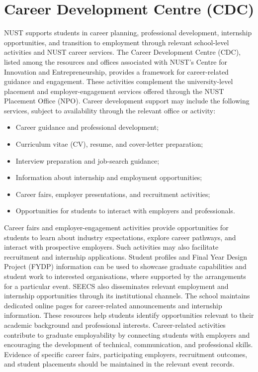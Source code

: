 \section{Career Development Centre (CDC)}

NUST supports students in career planning, professional development, internship opportunities, and transition to employment through relevant school-level activities and NUST career services. The Career Development Centre (CDC), listed among the resources and offices associated with NUST's Centre for Innovation and Entrepreneurship, provides a framework for career-related guidance and engagement. These activities complement the university-level placement and employer-engagement services offered through the NUST Placement Office (NPO). Career development support may include the following services, subject to availability through the relevant office or activity:

\begin{itemize}[noitemsep, topsep=0pt]
    \item Career guidance and professional development;
    \item Curriculum vitae (CV), resume, and cover-letter preparation;
    \item Interview preparation and job-search guidance;
    \item Information about internship and employment opportunities;
    \item Career fairs, employer presentations, and recruitment activities;
    \item Opportunities for students to interact with employers and professionals.
\end{itemize}

Career fairs and employer-engagement activities provide opportunities for students to learn about industry expectations, explore career pathways, and interact with prospective employers. Such activities may also facilitate recruitment and internship applications. Student profiles and Final Year Design Project (FYDP) information can be used to showcase graduate capabilities and student work to interested organisations, where supported by the arrangements for a particular event. SEECS also disseminates relevant employment and internship opportunities through its institutional channels. The school maintains dedicated online pages for career-related announcements and internship information. These resources help students identify opportunities relevant to their academic background and professional interests. Career-related activities contribute to graduate employability by connecting students with employers and encouraging the development of technical, communication, and professional skills. Evidence of specific career fairs, participating employers, recruitment outcomes, and student placements should be maintained in the relevant event records.


